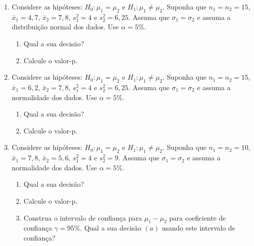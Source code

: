 \documentclass[8pt, a4paper]{article}
\begin{document}
\begin{enumerate}
	\item Considere as hipóteses: $H_0: \mu_1 = \mu_2$ e $H_1: \mu_1 \neq \mu_2$. Suponha que $n_1=n_2=15$, $\bar{x}_1 = 4,7$, $\bar{x}_2=7,8$, $s_1^2=4$ e $s_2^2=6,25$. Assuma que $\sigma_1 = \sigma_2$ e assuma a distribuição normal dos dados. Use $\alpha = 5\%$.
	\begin{enumerate}
		\item Qual a sua decisão?
		\item Calcule o valor-p.
	\end{enumerate}

	\item Considere as hipóteses: $H_0:\mu_1 = \mu_2$ e $H_1: \mu_1 \neq \mu_2$. Suponha que $n_1=n_2=15$, $\bar{x}_1=6,2$, $\bar{x}_2 = 7,8$, $s_1^2 = 4$ e $s_2^2 = 6,25$. Assuma que $\sigma_1 = \sigma_2$ e assuma a normalidade dos dados. Use $\alpha = 5\%$.
	\begin{enumerate}
		\item Qual a sua decisão?
		\item Calcule o valor-p.
	\end{enumerate}

	\item Considere as hipóteses: $H_0: \mu_1 = \mu_2$ e $H_1: \mu_1 \neq \mu_2$. Suponha que $n_1=n_2=10$, $\bar{x}_1=7,8$, $\bar{x}_2=5,6$, $s_1^2 = 4$ e $s_2^2 = 9$. Assuma que $\sigma_1 = \sigma_2$ e assuma a normalidade dos dados. Use $\alpha=5\%$.
	\begin{enumerate}
		\item Qual a sua decisão?
		\item Calcule o valor-p.
		\item Construa o intervalo de confiança para $\mu_1 - \mu_2$ para coeficiente de confiança $\gamma=95\%$. Qual a sua decisão $(a)$ usando este intervalo de confiança?
	\end{enumerate}


\end{enumerate}
\end{document}
